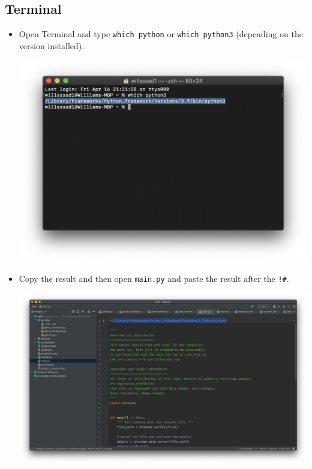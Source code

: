 \documentclass[11pt]{article}
\begin{document}
\subsection*{Terminal}
    
    \begin{itemize}
        \item Open Terminal and type \texttt{which python} or \texttt{which python3} (depending on the version installed).
            
        \begin{center}
            \includegraphics[scale=0.45]{terminal1.png}
        \end{center}
            
        \item Copy the result and then open \texttt{main.py} and paste the result after the \texttt{!\#}.
             
        \begin{center}
            \includegraphics[scale=0.2]{terminal4.png}
        \end{center}
        

\end{itemize}
\end{document}
